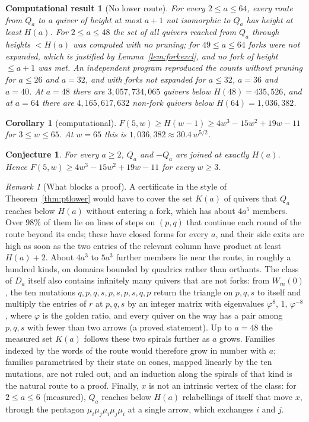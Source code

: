 \documentclass[11pt]{amsart}
\newtheorem{corollary}[theorem]{Corollary}
\newtheorem{conjecture}[theorem]{Conjecture}
\newtheorem{computation}[theorem]{Computational result}
\theoremstyle{definition}
\theoremstyle{remark}
\newtheorem{remark}[theorem]{Remark}
\begin{document}
\begin{computation}[No lower route]\label{comp:qa}
For every $2\le a\le64$, every route from $Q_a$ to a quiver of height at most $a+1$ not isomorphic to $Q_a$ has height at least $H(a)$. For $2\le a\le48$ the set of all quivers reached from $Q_a$ through heights $<H(a)$ was computed with no pruning; for $49\le a\le64$ forks were not expanded, which is justified by Lemma~\ref{lem:forkexcl}, and no fork of height $\le a+1$ was met. An independent program reproduced the counts without pruning for $a\le26$ and $a=32$, and with forks not expanded for $a\le32$, $a=36$ and $a=40$. At $a=48$ there are $3{,}057{,}734{,}065$ quivers below $H(48)=435{,}526$, and at $a=64$ there are $4{,}165{,}617{,}632$ non-fork quivers below $H(64)=1{,}036{,}382$.
\end{computation}

\begin{corollary}[computational]\label{cor:qa}
$F(5,w)\ge H(w-1)\ge4w^3-15w^2+19w-11$ for $3\le w\le65$. At $w=65$ this is $1{,}036{,}382\approx30.4\,w^{5/2}$.
\end{corollary}

\begin{conjecture}\label{conj:cubic}
For every $a\ge2$, $Q_a$ and $-Q_a$ are joined at exactly $H(a)$. Hence $F(5,w)\ge4w^3-15w^2+19w-11$ for every $w\ge3$.
\end{conjecture}

\begin{remark}[What blocks a proof]\label{rem:spirals}
A certificate in the style of Theorem~\ref{thm:ptlower} would have to cover the set $K(a)$ of quivers that $Q_a$ reaches below $H(a)$ without entering a fork, which has about $4a^5$ members. Over $98\%$ of them lie on lines of steps on $(p,q)$ that continue each round of the route beyond its ends; these have closed forms for every $a$, and their side exits are high as soon as the two entries of the relevant column have product at least $H(a)+2$. About $4a^3$ to $5a^3$ further members lie near the route, in roughly a hundred kinds, on domains bounded by quadrics rather than orthants. The class of $D_a$ itself also contains infinitely many quivers that are not forks: from $W_m(0)$, the ten mutations $q,p,q,s,p,s,p,s,q,p$ return the triangle on $p,q,s$ to itself and multiply the entries of $r$ at $p,q,s$ by an integer matrix with eigenvalues $\varphi^8$, $1$, $\varphi^{-8}$, where $\varphi$ is the golden ratio, and every quiver on the way has a pair among $p,q,s$ with fewer than two arrows (a proved statement). Up to $a=48$ the measured set $K(a)$ follows these two spirals further as $a$ grows. Families indexed by the words of the route would therefore grow in number with $a$; families parametrised by their state on cones, mapped linearly by the ten mutations, are not ruled out, and an induction along the spirals of that kind is the natural route to a proof. Finally, $x$ is not an intrinsic vertex of the class: for $2\le a\le6$ (measured), $Q_a$ reaches below $H(a)$ relabellings of itself that move $x$, through the pentagon $\mu_i\mu_j\mu_i\mu_j\mu_i$ at a single arrow, which exchanges $i$ and $j$.
\end{remark}
\end{document}
